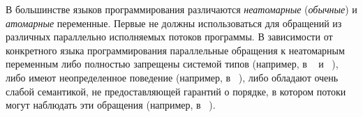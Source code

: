 
В большинстве языков программирования различаются 
\emph{неатомарные} (\emph{обычные})
и \emph{атомарные} переменные.
Первые не должны использоваться для  
обращений из различных параллельно исполняемых потоков программы. 
В зависимости от конкретного языка программирования
параллельные обращения к неатомарным переменным 
либо полностью запрещены системой типов
(например, в  \Haskell~\cite{Marlow-al:Haskell10, Vollmer-al:PPoPP17} и \Rust~\cite{RustBook:19}), 
либо имеют неопределенное поведение (например, в  \CPP~\cite{Boehm-Adve:PLDI08, Batty-al:POPL11}), 
либо обладают очень слабой семантикой,
не предоставляющей гарантий о порядке,
в котором  потоки могут наблюдать эти обращения
(например, в \Java~\cite{Manson-al:POPL05}). 

